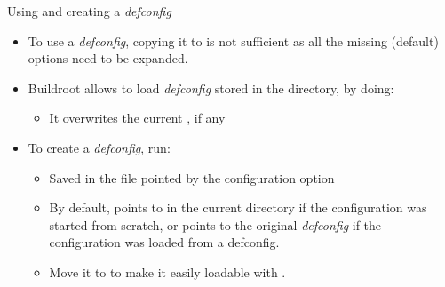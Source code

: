\begin{frame}{Using and creating a {\em defconfig}}
  \begin{itemize}
  \item To use a {\em defconfig}, copying it to  is not
    sufficient as all the missing (default) options need to be
    expanded.
  \item Buildroot allows to load {\em defconfig} stored in the
     directory, by doing:
    \begin{itemize}
    \item It overwrites the current , if any
    \end{itemize}
  \item To create a {\em defconfig}, run:\\
    \begin{itemize}
    \item Saved in the file pointed by the 
      configuration option
    \item By default, points to  in the current
      directory if the configuration was started from scratch, or
      points to the original {\em defconfig} if the configuration was
      loaded from a defconfig.
    \item Move it to  to make it easily loadable with
      .
    \end{itemize}
  \end{itemize}
\end{frame}

